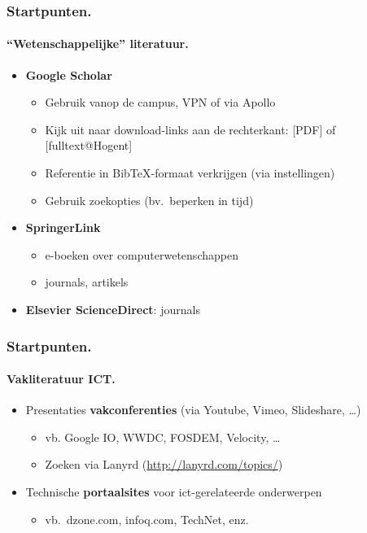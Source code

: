 \documentclass[aspectratio=169]{beamer}
\begin{document}
\begin{frame}
  \frametitle{Startpunten.}
  \framesubtitle{``Wetenschappelijke'' literatuur.}

  \begin{itemize}
    \item<+-> \textbf{Google Scholar}
      \begin{itemize}
        \item Gebruik vanop de campus, VPN of via Apollo
        \item Kijk uit naar download-links aan de rechterkant: [PDF] of [fulltext@Hogent]
        \item Referentie in Bib{\TeX}-formaat verkrijgen (via instellingen)
        \item Gebruik zoekopties (bv.~beperken in tijd)
      \end{itemize}
    \item<+-> \textbf{SpringerLink}
      \begin{itemize}
        \item e-boeken over computerwetenschappen
        \item journals, artikels
      \end{itemize}
    \item<+-> \textbf{Elsevier ScienceDirect}: journals
  \end{itemize}
\end{frame}

\begin{frame}
  \frametitle{Startpunten.}
  \framesubtitle{Vakliteratuur ICT.}

  \begin{itemize}
    \item Presentaties \textbf{vakconferenties} (via Youtube, Vimeo, Slideshare, \dots)
    \begin{itemize}
      \item vb. Google IO, WWDC, FOSDEM, Velocity, \dots
      \item Zoeken via Lanyrd (\url{http://lanyrd.com/topics/})
    \end{itemize}
    \item<+-> Technische \textbf{portaalsites} voor ict-gerelateerde onderwerpen
    \begin{itemize}
      \item vb.~dzone.com, infoq.com, TechNet, enz.
    \end{itemize}
  \end{itemize}
\end{frame}
\end{document}
